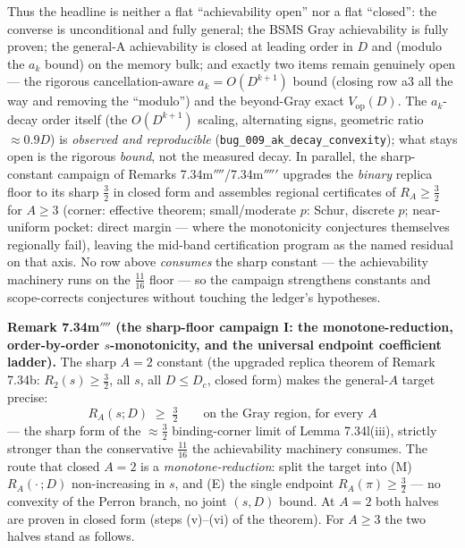 \documentclass[
]{article}
\begin{document}
\noindent Thus the headline is neither a flat ``achievability open'' nor a flat
``closed'': the converse is unconditional and fully general; the BSMS Gray
achievability is fully proven; the general-A achievability is closed at leading
order in $D$ and (modulo the $a_k$ bound) on the memory bulk; and exactly two
items remain genuinely open --- the rigorous cancellation-aware $a_k=O(D^{k+1})$
bound (closing row a3 all the way and removing the ``modulo'') and the
beyond-Gray exact $V_{\mathrm{op}}(D)$. The $a_k$-decay order itself (the
$O(D^{k+1})$ scaling, alternating signs, geometric ratio $\approx0.9D$) is
\emph{observed and reproducible} (\texttt{bug\_009\_ak\_decay\_convexity}); what
stays open is the rigorous \emph{bound}, not the measured decay.
In parallel, the sharp-constant campaign of Remarks 7.34m$''''$/7.34m$'''''$
upgrades the \emph{binary} replica floor to its sharp $\tfrac32$ in closed form
and assembles regional certificates of $R_A\ge\tfrac32$ for $A\ge3$ (corner:
effective theorem; small/moderate $p$: Schur, discrete $p$; near-uniform
pocket: direct margin --- where the monotonicity conjectures themselves
regionally fail), leaving the mid-band certification program as the named
residual on that axis. No row above \emph{consumes} the sharp constant --- the
achievability machinery runs on the $\tfrac{11}{16}$ floor --- so the campaign
strengthens constants and scope-corrects conjectures without touching the
ledger's hypotheses.

\textbf{Remark 7.34m$''''$ (the sharp-floor campaign I: the monotone-reduction,
order-by-order $s$-monotonicity, and the universal endpoint coefficient
ladder).} The sharp $A=2$ constant (the upgraded replica theorem of Remark
7.34b: $R_2(s)\ge\tfrac32$, all $s$, all $D\le D_c$, closed form) makes the
general-$A$ target precise:
\[
  R_A(s;D)\;\ge\;\tfrac32\qquad\text{on the Gray region, for every }A
\]
--- the sharp form of the $\approx\tfrac32$ binding-corner limit of Lemma
7.34l(iii), strictly stronger than the conservative $\tfrac{11}{16}$ the
achievability machinery consumes. The route that closed $A=2$ is a
\emph{monotone-reduction}: split the target into (M) $R_A(\cdot\,;D)$
non-increasing in $s$, and (E) the single endpoint $R_A(\pi)\ge\tfrac32$ ---
no convexity of the Perron branch, no joint $(s,D)$ bound. At $A=2$ both
halves are proven in closed form (steps (v)--(vi) of the theorem). For
$A\ge3$ the two halves stand as follows.
\end{document}
